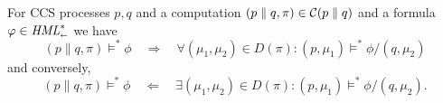 \begin{theorem}\label{thm:decomposition}
    For CCS processes $p,q$ and a computation $(p \parallel q, \pi)\in \mathcal{C}(p\parallel q)$
    and a formula $\varphi \in \textit{HML}_\shortleftarrow^*$ we have
    \begin{equation}\label{eq:decomp_ltr}
        (p\parallel q, \pi) \vDash^* \phi  \quad\Rightarrow\quad
        \forall (\mu_1,\mu_2) \in D(\pi) : (p, \mu_1) \vDash^* \phi/(q, \mu_2)
    \end{equation}
    and conversely,
    \begin{equation}\label{eq:decomp_rtl}
        (p\parallel q, \pi) \vDash^* \phi
        \quad\Leftarrow\quad
        \exists (\mu_1,\mu_2) \in D(\pi) : (p, \mu_1) \vDash^* \phi/(q, \mu_2).
    \end{equation}
\end{theorem}
